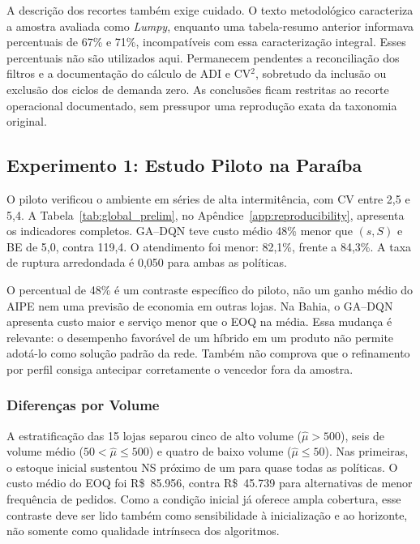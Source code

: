 A descrição dos recortes também exige cuidado. O texto metodológico caracteriza a amostra avaliada como \textit{Lumpy}, enquanto uma tabela-resumo anterior informava percentuais de 67\% e 71\%, incompatíveis com essa caracterização integral. Esses percentuais não são utilizados aqui. Permanecem pendentes a reconciliação dos filtros e a documentação do cálculo de ADI e CV$^2$, sobretudo da inclusão ou exclusão dos ciclos de demanda zero. As conclusões ficam restritas ao recorte operacional documentado, sem pressupor uma reprodução exata da taxonomia original.

\subsection{Experimento 1: Estudo Piloto na Paraíba}
\label{sec:experimento1}

O piloto verificou o ambiente em séries de alta intermitência, com CV entre 2,5 e 5,4. A Tabela~\ref{tab:global_prelim}, no Apêndice~\ref{app:reproducibility}, apresenta os indicadores completos. GA--DQN teve custo médio 48\% menor que $(s,S)$ e BE de 5,0, contra 119,4. O atendimento foi menor: 82,1\%, frente a 84,3\%. A taxa de ruptura arredondada é 0,050 para ambas as políticas.

O percentual de 48\% é um contraste específico do piloto, não um ganho médio do AIPE nem uma previsão de economia em outras lojas. Na Bahia, o GA--DQN apresenta custo maior e serviço menor que o EOQ na média. Essa mudança é relevante: o desempenho favorável de um híbrido em um produto não permite adotá-lo como solução padrão da rede. Também não comprova que o refinamento por perfil consiga antecipar corretamente o vencedor fora da amostra.

\subsubsection{Diferenças por Volume}

A estratificação das 15 lojas separou cinco de alto volume ($\hat\mu>500$), seis de volume médio ($50<\hat\mu\leq500$) e quatro de baixo volume ($\hat\mu\leq50$). Nas primeiras, o estoque inicial sustentou NS próximo de um para quase todas as políticas. O custo médio do EOQ foi R\$~85.956, contra R\$~45.739 para alternativas de menor frequência de pedidos. Como a condição inicial já oferece ampla cobertura, esse contraste deve ser lido também como sensibilidade à inicialização e ao horizonte, não somente como qualidade intrínseca dos algoritmos.

